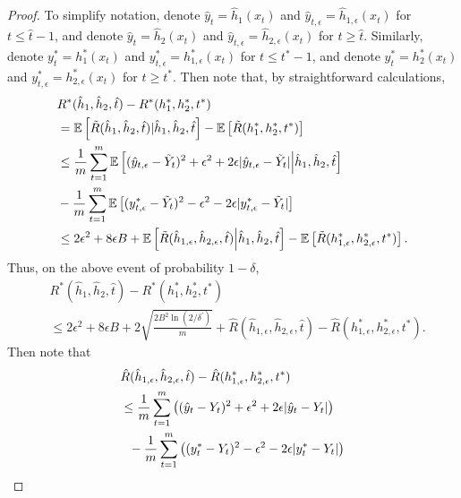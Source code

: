 \documentclass{article}
\begin{document}
\begin{proof}
To simplify notation, denote $\hat{y}_{t} = \hat{h}_{1}(x_{t})$ and $\hat{y}_{t,\epsilon} = \hat{h}_{1,\epsilon}(x_{t})$ for $t \leq \hat{t}-1$,
and denote $\hat{y}_{t} = \hat{h}_{2}(x_{t})$ and $\hat{y}_{t,\epsilon} = \hat{h}_{2,\epsilon}(x_{t})$ for $t \geq \hat{t}$.
Similarly, denote $y_{t}^{*} = h_{1}^{*}(x_{t})$ and $y_{t,\epsilon}^{*} = h_{1,\epsilon}^{*}(x_{t})$ for $t \leq t^{*}-1$,
and denote $y_{t}^{*} = h_{2}^{*}(x_{t})$ and $y_{t,\epsilon}^{*} = h_{2,\epsilon}^{*}(x_{t})$ for $t \geq t^{*}$.
Then note that, by straightforward calculations,
\begin{align*}
&R^{*}(\hat{h}_{1},\hat{h}_{2},\hat{t}) - R^{*}(h_{1}^{*},h_{2}^{*},t^{*})\\ & = \mathbb{E}\left[ \tilde{R}(\hat{h}_{1},\hat{h}_{2},\hat{t}) | \hat{h}_{1},\hat{h}_{2},\hat{t} \right] - \mathbb{E}\left[ \tilde{R}(h_{1}^{*},h_{2}^{*},t^{*}) \right]
\\ & \leq \frac{1}{m} \sum_{t=1}^{m} \mathbb{E}\left[ ( \hat{y}_{t,\epsilon} - \tilde{Y}_{t} )^{2} + \epsilon^{2} + 2 \epsilon | \hat{y}_{t,\epsilon} - \tilde{Y}_{t} | \Big| \hat{h}_{1},\hat{h}_{2},\hat{t} \right]
\\ & - \frac{1}{m} \sum_{t=1}^{m} \mathbb{E}\left[ (y_{t,\epsilon}^{*} - \tilde{Y}_{t})^{2} - \epsilon^{2} - 2 \epsilon | y_{t,\epsilon}^{*} - \tilde{Y}_{t} | \right]
\\ & \leq 2 \epsilon^{2} + 8 \epsilon B 
+ \mathbb{E}\left[ \tilde{R}(\hat{h}_{1,\epsilon}, \hat{h}_{2,\epsilon}, \hat{t}) \Big| \hat{h}_{1}, \hat{h}_{2}, \hat{t} \right] - \mathbb{E}\left[ \tilde{R}(h_{1,\epsilon}^{*},h_{2,\epsilon}^{*},t^{*}) \right].
\end{align*}
Thus, on the above event of probability $1-\delta$, 
\begin{align*}
&R^{*}(\hat{h}_{1},\hat{h}_{2},\hat{t}) - R^{*}(h_{1}^{*},h_{2}^{*},t^{*})\\& \leq
2 \epsilon^{2} + 8 \epsilon B + 2 \sqrt{\frac{2 B^{2} \ln(2/\delta^{\prime})}{m}} 
+ \hat{R}(\hat{h}_{1,\epsilon},\hat{h}_{2,\epsilon},\hat{t}) - \hat{R}(h_{1,\epsilon}^{*},h_{2,\epsilon}^{*},t^{*}).
\end{align*}
Then note that 
\begin{align}
&\hat{R}(\hat{h}_{1,\epsilon},\hat{h}_{2,\epsilon},\hat{t}) - \hat{R}(h_{1,\epsilon}^{*},h_{2,\epsilon}^{*},t^{*}) \notag
 \\& \leq \frac{1}{m} \sum_{t=1}^{m} \left( ( \hat{y}_{t} - Y_{t} )^{2} + \epsilon^{2} + 2 \epsilon | \hat{y}_{t} - Y_{t} | \right) \notag
\\ & ~~- \frac{1}{m} \sum_{t=1}^{m} \left( (y_{t}^{*} - Y_{t})^{2} - \epsilon^{2} - 2 \epsilon | y_{t}^{*} - Y_{t} | \right) \notag

\end{align}
\end{proof}
\end{document}

